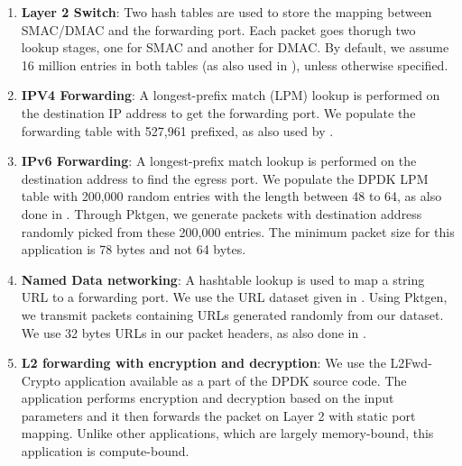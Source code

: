 \begin{enumerate}
\item \textbf{Layer 2 Switch}: Two hash tables are used to store the mapping between SMAC/DMAC and the forwarding port. Each packet goes thorugh two lookup stages, one for SMAC and another for DMAC. By default, we assume 16 million entries in both tables (as also used in \cite{189006}), unless otherwise specified.
\item \textbf{IPV4 Forwarding}: A longest-prefix match (LPM) lookup is performed on the destination IP address to get the forwarding port.
We populate the forwarding table with 527,961 prefixed, as also used by \cite{189006}.
\item \textbf{IPv6 Forwarding}: A longest-prefix match lookup is performed on the destination address to find the egress port. We populate the DPDK LPM table with 200,000 random entries with the length between 48 to 64, as also done in \cite{189006}. Through Pktgen, we generate packets with destination address randomly picked from these 200,000 entries. The minimum packet size for this application is 78 bytes and not 64 bytes.
\item \textbf{Named Data networking}: A hashtable lookup is used to map a string URL to a forwarding port.
We use the URL dataset given in \cite{DBLP:conf/globecom/ZhangWYLL13}. Using Pktgen, we transmit packets containing URLs generated randomly from our dataset. We use 32 bytes URLs in our packet headers, as also done in \cite{189006}.
\item \textbf{L2 forwarding with encryption and decryption}: We use the L2Fwd-Crypto\cite{l2crypto} application available as a part of the DPDK source code. The application performs encryption and decryption based on the input parameters and it then forwards the packet on Layer 2 with static port mapping. Unlike other applications, which are largely memory-bound, this application is compute-bound.
\end{enumerate}

